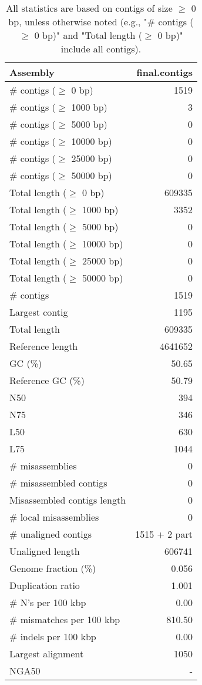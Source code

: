 \documentclass[12pt,a4paper]{article}
\begin{document}
\begin{table}[ht]
\begin{center}
\caption{All statistics are based on contigs of size $\geq$ 0 bp, unless otherwise noted (e.g., "\# contigs ($\geq$ 0 bp)" and "Total length ($\geq$ 0 bp)" include all contigs).}
\begin{tabular}{|l*{1}{|r}|}
\hline
Assembly & final.contigs \\ \hline
\# contigs ($\geq$ 0 bp) & 1519 \\ \hline
\# contigs ($\geq$ 1000 bp) & 3 \\ \hline
\# contigs ($\geq$ 5000 bp) & 0 \\ \hline
\# contigs ($\geq$ 10000 bp) & 0 \\ \hline
\# contigs ($\geq$ 25000 bp) & 0 \\ \hline
\# contigs ($\geq$ 50000 bp) & 0 \\ \hline
Total length ($\geq$ 0 bp) & 609335 \\ \hline
Total length ($\geq$ 1000 bp) & 3352 \\ \hline
Total length ($\geq$ 5000 bp) & 0 \\ \hline
Total length ($\geq$ 10000 bp) & 0 \\ \hline
Total length ($\geq$ 25000 bp) & 0 \\ \hline
Total length ($\geq$ 50000 bp) & 0 \\ \hline
\# contigs & 1519 \\ \hline
Largest contig & 1195 \\ \hline
Total length & 609335 \\ \hline
Reference length & 4641652 \\ \hline
GC (\%) & 50.65 \\ \hline
Reference GC (\%) & 50.79 \\ \hline
N50 & 394 \\ \hline
N75 & 346 \\ \hline
L50 & 630 \\ \hline
L75 & 1044 \\ \hline
\# misassemblies & 0 \\ \hline
\# misassembled contigs & 0 \\ \hline
Misassembled contigs length & 0 \\ \hline
\# local misassemblies & 0 \\ \hline
\# unaligned contigs & 1515 + 2 part \\ \hline
Unaligned length & 606741 \\ \hline
Genome fraction (\%) & 0.056 \\ \hline
Duplication ratio & 1.001 \\ \hline
\# N's per 100 kbp & 0.00 \\ \hline
\# mismatches per 100 kbp & 810.50 \\ \hline
\# indels per 100 kbp & 0.00 \\ \hline
Largest alignment & 1050 \\ \hline
NGA50 & - \\ \hline
\end{tabular}
\end{center}
\end{table}
\end{document}
